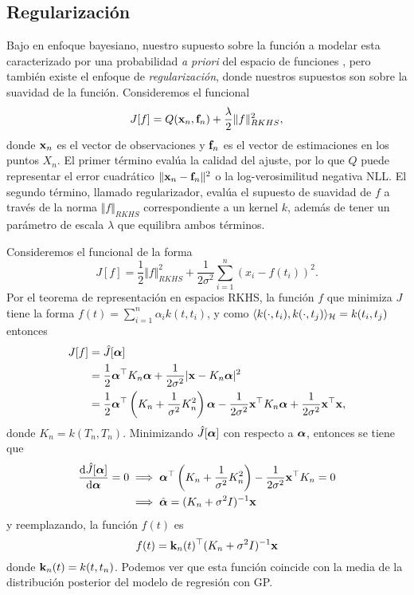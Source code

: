 \subsection{Regularización}

Bajo en enfoque bayesiano, nuestro supuesto sobre la función a modelar esta caracterizado por una probabilidad \emph{a priori} del espacio de funciones \cite{rasmussen06}, pero también existe el enfoque de \emph{regularización}, donde nuestros supuestos son sobre la suavidad de la función. Consideremos el funcional
\begin{equation*}
	J[f] = Q(\mathbf{x}_{n}, \mathbf{f}_{n}) +\frac{\lambda}{2} \Vert f \Vert_{RKHS}^{2},
\end{equation*}
donde \(\mathbf{x}_{n}\) es el vector de observaciones y \(\mathbf{f}_{n}\) es el vector de estimaciones en los puntos \(X_{n}\). El primer término evalúa la calidad del ajuste, por lo que \(Q\) puede representar el error cuadrático  \(\Vert \mathbf{x}_{n} - \mathbf{f}_{n}\Vert^{2}\) o la log-verosimilitud negativa NLL. El segundo término, llamado regularizador, evalúa el supuesto de suavidad de \(f\) a través de la norma \(\Vert f\Vert_{RKHS}\) correspondiente a un kernel \(k\), además de tener un parámetro de escala \(\lambda\) que equilibra ambos términos.

Consideremos el funcional de la forma \cite{kimeldorf1971some}
\begin{equation*}
	J[f] = \frac{1}{2} \Vert f \Vert_{RKHS}^{2} + \frac{1}{2 \sigma^2} \sum_{i=1}^{n} (x_{i} - f(t_{i}))^{2}.
\end{equation*}%
Por el teorema de representación en espacios RKHS, la función \(f\) que minimiza \(J\) tiene la forma \(f(t) = \sum\nolimits_{i=1}^{n} \alpha _{i} k(t, t_{i})\), y como \(\langle k(\cdot, t_{i}), k(\cdot, t_{j})\rangle_{\mathcal{H}} = k(t_{i}, t_{j})\) entonces
\begin{align*}
	J[f]	&= \hat{J}[\boldsymbol{\alpha}]\\
			&= \frac{1}{2} \boldsymbol{\alpha}^{\top }K_{n} \boldsymbol{\alpha} + \frac{1}{2\sigma^2} \vert \mathbf{x} - K_{n}\boldsymbol{\alpha} \vert^{2} \\
			&= \frac{1}{2} \boldsymbol{\alpha}^{\top} \left(K_{n} + \frac{1}{\sigma^2} K_{n}^{2}\right) \boldsymbol{\alpha} - \frac{1}{2\sigma^2} \mathbf{x}^{\top} K_{n} \boldsymbol{\alpha} + \frac{1}{2 \sigma^2} \mathbf{x}^{\top} \mathbf{x},
\end{align*}
donde \(K_{n} = k(T_{n}, T_{n})\). Minimizando \(\hat{J}[\boldsymbol{\alpha}]\) con respecto a \(\boldsymbol{\alpha}\), entonces se tiene que
\begin{align*}
	\dv{\hat{J}[\boldsymbol{\alpha}]}{\boldsymbol{\alpha}} = 0	& \implies \boldsymbol{\alpha}^{\top} \left(K_{n} + \frac{1}{\sigma^2} K_{n}^{2}\right) - \frac{1}{2\sigma^2} \mathbf{x}^{\top}K_{n} = 0 \\
											& \implies \hat{\boldsymbol{\alpha}} = (K_{n} + \sigma^2I)^{-1} \mathbf{x}
\end{align*}
y reemplazando, la función \(f(t)\) es
\[f(t) = \mathbf{k}_{n}(t)^{\top} (K_{n} + \sigma^{2}I)^{-1} \mathbf{x}\]
donde \(\mathbf{k}_{n}(t) = k(t, t_{n})\). Podemos ver que esta función coincide con la media de la distribución posterior del modelo de regresión con GP.


